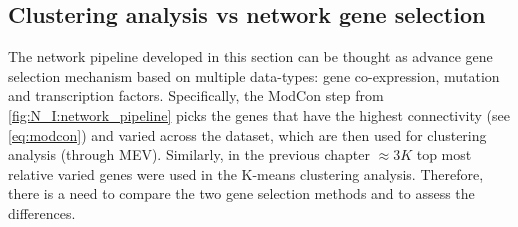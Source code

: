 



\subsection{Clustering analysis vs network gene selection} \label{s:N_I:cs_vs_gene_sel}

The network pipeline developed in this section can be thought as advance gene selection mechanism based on multiple data-types: gene co-expression, mutation and transcription factors. Specifically, the ModCon step from  \cref{fig:N_I:network_pipeline} picks the genes that have the highest connectivity (see \cref{eq:modcon}) and varied across the dataset, which are then used for clustering analysis (through MEV). Similarly, in the previous chapter $\approx3K$ top most relative varied genes were used in the K-means clustering analysis. Therefore, there is a need to compare the two gene selection methods and to assess the differences.

